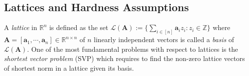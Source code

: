 \documentclass[conference]{IEEEtran}
\begin{document}
	
	
	\iffalse
	\subsection{Lattices} \label{lat}
	A \textit{lattice} is a set of all integral combination of given linearly independent vectors. Formally, given a matrix $\mathbf{A}=[\mathbf{a}_1, \cdots, \mathbf{a}_m]\in \mathbb{R}^{n \times m}$ such that $\mathbf{a}_i$'s are linearly independent, a lattice of \textit{basis} $\mathbf{A}$ is the set
	$\mathcal{L}(\mathbf{A}):=\{\sum_{i \in [m]}\mathbf{a}_iz_i: z_i\in \mathbb{Z}\}$. For such a lattice, we call $n$ the \textit{dimension} of $\mathcal{L}(\mathbf{A})$.
	Take for example, the following is also a lattice called \textit{$q$-ary lattice}: %
	\begin{equation}\label{eq12}
	\Lambda_q^{\bot}(\mathbf{A})=\{\mathbf{z} \in \mathbb{Z}^m: \mathbf{A}\mathbf{z}=\mathbf{0} \text{ (mod } q), \text{ where } \mathbf{A} \leftarrow_{\$} \mathbb{Z}^{n \times m} \},
	\end{equation}
	for a random matrix $\mathbf{A} \leftarrow_{\$} \mathbb{Z}^{n \times m}$.
	
	\fi
	\subsection{Lattices and Hardness Assumptions}
	
	A \textit{lattice} in $\mathbb{R}^n$ is defined as the set 
	$\mathcal{L}(\mathbf{A}):=\{\sum_{i \in [n]}\mathbf{a}_iz_i: z_i\in \mathbb{Z}\}$ where $\mathbf{A}=[\mathbf{a}_1, \cdots, \mathbf{a}_n]\in \mathbb{R}^{n \times n}$ of $n$ linearly independent vectors is called a \textit{basis} of  $\mathcal{L}(\mathbf{A})$. %
	One of the most fundamental problems with respect to lattices is the \textit{shortest vector problem} (\textsf{SVP}) which requires to find the non-zero lattice vectors of shortest norm in a lattice given its basis. 
	
\end{document}
